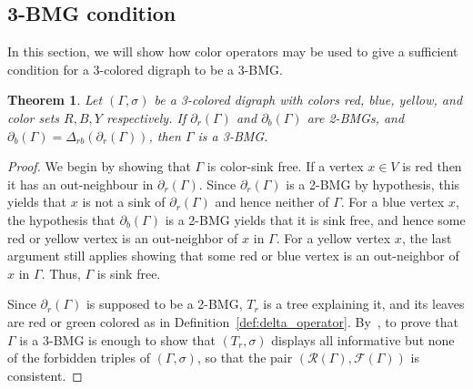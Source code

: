 \documentclass[final,3p,times]{elsarticle}
\newtheorem{theorem}{Theorem}[section]
\begin{document}
\subsection{3-BMG condition}
\label{sec:3-BMG condition}
In this section, we will show how color operators may be used to give a sufficient condition for a 3-colored digraph to be a 3-BMG.

\begin{theorem}\label{thm:sufficient_condition}
Let $(\Gamma,\sigma)$ be a 3-colored digraph with colors red, blue, yellow, and color sets $R,B,Y$ respectively. If $\partial_r(\Gamma)$ and $\partial_b(\Gamma)$ are 2-BMGs, and $\partial_b(\Gamma)=\Delta_{rb}(\partial_r(\Gamma))$, then $\Gamma$ is a 3-BMG.
\end{theorem}

\begin{proof}
We begin by showing that $\Gamma$ is color-sink free. If a vertex $x\in V$ is red then it has an out-neighbour in $\partial_{r}(\Gamma)$. Since $\partial_{r}(\Gamma)$ is a 2-BMG by hypothesis, this yields that $x$ is not a sink of $\partial_{r}(\Gamma)$ and hence neither of $\Gamma$. For a blue vertex $x$, the hypothesis that $\partial_b(\Gamma)$ is a 2-BMG yields that it is sink free, and hence some red or yellow vertex is an out-neighbor of $x$ in $\Gamma$. For a yellow vertex $x$, the last argument still applies showing that some red or blue vertex is an out-neighbor of $x$ in $\Gamma$. Thus, $\Gamma$ is sink free.

Since $\partial_{r}(\Gamma)$ is supposed to be a 2-BMG, $T_r$ is a tree explaining it, and its leaves are red or green colored as in Definition~\ref{def:delta_operator}. By~\cite[Proposition~2.3]{korchmaros2021quasi}, to prove that $\Gamma$ is a 3-BMG is enough to show that $(T_r,\sigma)$ displays all informative but none of the forbidden triples of $(\Gamma,\sigma)$, so that the pair $(\mathscr{R}(\Gamma),\mathscr{F}(\Gamma))$ is consistent.


\end{proof}
\end{document}
